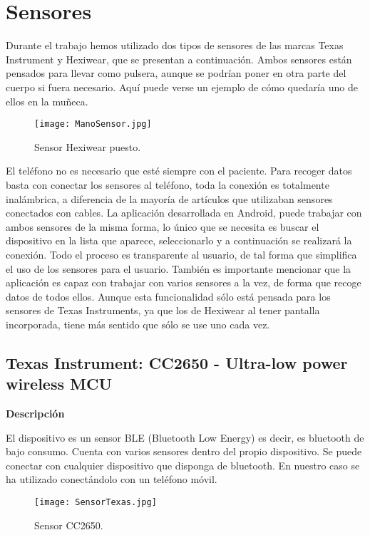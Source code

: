 \documentclass[11pt,spanish]{article}
\begin{document}
\section{Sensores}
Durante el trabajo hemos utilizado dos tipos de sensores de las marcas Texas Instrument y Hexiwear, que se presentan a continuación. Ambos sensores están pensados para llevar como pulsera, aunque se podrían poner en otra parte del cuerpo si fuera necesario. Aquí puede verse un ejemplo de cómo quedaría uno de ellos en la muñeca.
\begin{figure}[h!]
  \centering
  \texttt{[image: ManoSensor.jpg]}
  \caption{Sensor Hexiwear puesto.}
\end{figure}

El teléfono no es necesario que esté siempre con el paciente. Para recoger datos basta con conectar los sensores al teléfono, toda la conexión es totalmente inalámbrica, a diferencia de la mayoría de artículos que utilizaban sensores conectados con cables. La aplicación desarrollada en Android, puede trabajar con ambos sensores de la misma forma, lo único que se necesita es buscar el dispositivo en la lista que aparece, seleccionarlo y a continuación se realizará la conexión. Todo el proceso es transparente al usuario, de tal forma que simplifica el uso de los sensores para el usuario. También es importante mencionar que la aplicación es capaz con trabajar con varios sensores a la vez, de forma que recoge datos de todos ellos. Aunque esta funcionalidad sólo está pensada para los sensores de Texas Instruments, ya que los de Hexiwear al tener pantalla incorporada, tiene más sentido que sólo se use uno cada vez.
\newline

\subsection{Texas Instrument: CC2650 - Ultra-low power wireless MCU}
{\bf Descripción}
\newline

El dispositivo es un sensor BLE (Bluetooth Low Energy) es decir, es bluetooth de bajo consumo. Cuenta con varios sensores dentro del propio dispositivo. Se puede conectar con cualquier dispositivo que disponga de bluetooth. En nuestro caso se ha utilizado conectándolo con un teléfono móvil. 
\newline

\begin{figure}[h!]
  \centering
  \texttt{[image: SensorTexas.jpg]}
  \caption{Sensor CC2650.}
\end{figure}
\end{document}
